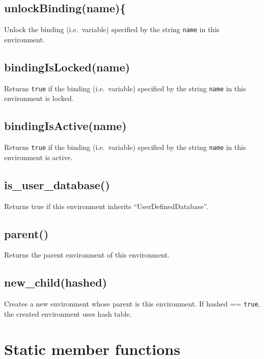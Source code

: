 \documentclass[]{book}
\begin{document}
\hypertarget{unlockbindingname}{%
\subsection{unlockBinding(name)\{}\label{unlockbindingname}}

Unlock the binding (i.e.~variable) specified by the string \texttt{name} in this environment.

\hypertarget{bindingislockedname}{%
\subsection{bindingIsLocked(name)}\label{bindingislockedname}}

Returns \texttt{true} if the binding (i.e.~variable) specified by the string \texttt{name} in this environment is locked.

\hypertarget{bindingisactivename}{%
\subsection{bindingIsActive(name)}\label{bindingisactivename}}

Returns \texttt{true} if the binding (i.e.~variable) specified by the string \texttt{name} in this environment is active.

\hypertarget{is_user_database}{%
\subsection{is\_user\_database()}\label{is_user_database}}

Returns true if this environment inherits ``UserDefinedDatabase''.

\hypertarget{parent}{%
\subsection{parent()}\label{parent}}

Returns the parent environment of this environment.

\hypertarget{new_childhashed}{%
\subsection{new\_child(hashed)}\label{new_childhashed}}

Creates a new environment whose parent is this environment. If hashed == \texttt{true}, the created environment uses hash table.

\hypertarget{static-member-functions-2}{%
\section{Static member functions}\label{static-member-functions-2}}
\end{document}

